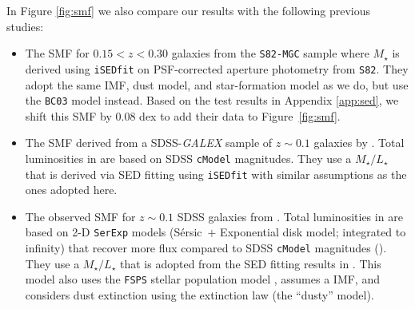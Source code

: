 \documentclass[a4paper,fleqn,usenatbib]{mnras}
\def\ser{{S\'{e}rsic\ }}
\def\cmodel{\texttt{cModel}}
\def\mstar{{$M_{\star}$}}
\def\m2l{{$M_{\star}/L_{\star}$}}
\begin{document}
    In Figure \ref{fig:smf} we also compare our results with the following previous 
    studies:

    \begin{itemize}

        \item The SMF for $0.15 < z < 0.30$ galaxies from the \texttt{S82-MGC} sample
            \citep{Leauthaud2016} where \mstar{} is derived using 
            \texttt{iSEDfit} on PSF-corrected aperture photometry from \texttt{S82}. 
            They adopt the same IMF, dust model, and star-formation model as we do, 
            but use the \texttt{BC03} model instead. 
            Based on the test results in Appendix \ref{app:sed}, we shift this SMF by 
            0.08 dex to add their data to Figure~\ref{fig:smf}.      
       
        \item The SMF derived from a SDSS-\textit{GALEX} sample of $z{\sim} 0.1$ 
            galaxies by \citet{Moustakas13}. 
            Total luminosities in \citet{Moustakas13} are based on SDSS \cmodel{} 
            magnitudes. 
            They use a \m2l{} that is derived via SED fitting using \texttt{iSEDfit} 
            with similar assumptions as the ones adopted here.
            
        \item The observed SMF for $z{\sim} 0.1$ SDSS galaxies from \citet{Bernardi2017}.          
            Total luminosities in \citet{Bernardi2017} are based on 2-D \texttt{SerExp} 
            models (\ser{}$+$ Exponential disk model; integrated to infinity) that 
            recover more flux compared to SDSS \cmodel{} magnitudes 
            (\citealt{Bernardi2013, Meert2015}). 
            They use a \m2l{} that is adopted from the SED fitting results in
            \citet{Mendel2014}. 
            This model also uses the \texttt{FSPS} stellar population model 
            \citep{FSPS}, assumes a \citet{Chabrier2003} IMF, and considers dust 
            extinction using the \citet{Calzetti2000} extinction law (the 
            ``dusty'' model).
            
    \end{itemize}
    
\end{document}
